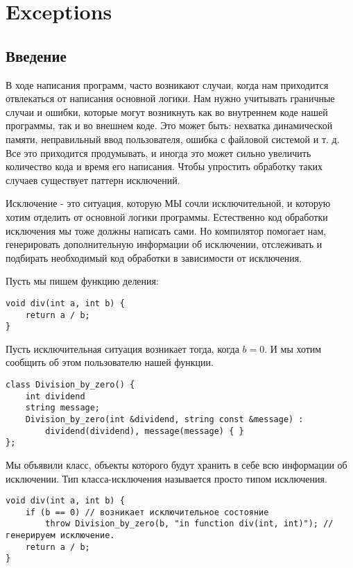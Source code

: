 \section{Exceptions}
\subsection{Введение}
В ходе написания программ, часто возникают случаи, когда нам приходится отвлекаться от написания основной логики. Нам нужно учитывать граничные случаи и ошибки, которые могут возникнуть как во внутреннем коде нашей программы, так и во внешнем коде. Это может быть: нехватка динамической памяти, неправильный ввод пользователя, ошибка с файловой системой и т. д.
Все это приходится продумывать, и иногда это может сильно увеличить количество кода и время его написания. Чтобы упростить обработку таких случаев существует паттерн исключений.

Исключение - это ситуация, которую МЫ сочли исключительной, и которую хотим отделить от основной логики программы. Естественно код обработки исключения мы тоже должны написать сами. Но компилятор помогает нам, генерировать дополнительную информации об исключении, отслеживать и подбирать необходимый код обработки в зависимости от исключения.

Пусть мы пишем функцию деления:
\begin{verbatim}
void div(int a, int b) {
    return a / b;
}
\end{verbatim}

Пусть исключительная ситуация возникает тогда, когда $b = 0$. И мы хотим сообщить об этом пользователю нашей функции.

\begin{verbatim}
class Division_by_zero() {
    int dividend
    string message;
    Division_by_zero(int &dividend, string const &message) :
        dividend(dividend), message(message) { }
};
\end{verbatim}

Мы объявили класс, объекты которого будут хранить в себе всю информации об исключении. Тип класса-исключения называется просто типом исключения.

\begin{verbatim}
void div(int a, int b) {
    if (b == 0) // возникает исключительное состояние
        throw Division_by_zero(b, "in function div(int, int)"); // генерируем исключение.
    return a / b;
}
\end{verbatim}

